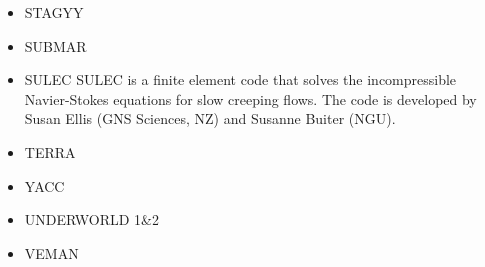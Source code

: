 \begin{itemize}
\item STAGYY
\cite{rota11}
\cite{yadl14}
\cite{crta14}


\item SUBMAR
\cite{masr06}
\cite{masp07}
\cite{roms10}


\item SULEC
SULEC is a finite element code that solves the incompressible Navier-Stokes equations 
for slow creeping flows. The code is developed by Susan Ellis 
(GNS Sciences, NZ) and Susanne Buiter (NGU). 

\cite{qube11}
\cite{ellw11}
\cite{buit12}
\cite{tebu12} 
\cite{crsg12}
\cite{grel12}
\cite{ghbu13}
\cite{ghbu14}
\cite{qubu14}
\cite{nabu15}
\cite{zwsn16}
\cite{tebu17}










\item TERRA
\cite{burb97}
\cite{burl98}
\cite{phbs09}
\cite{wodd09}
\cite{woda11}
\cite{dadb13}
\cite{vade16}



\item YACC
\cite{tosn15}
\cite{tomy16}

\item UNDERWORLD 1\&2
\cite{stfs06}
\cite{moql07} 
\cite{stfs07}
\cite{lemm08}
\cite{ozrl08}
\cite{casm10}
\cite{mamb10}
\cite{stsf10}
\cite{stfc10}
\cite{fasm10}
\cite{cafz11}
\cite{cafa12}
\cite{bemm13}
\cite{scmo13}
\cite{faca13}
\cite{famc14}
\cite{quxm15}
\cite{bemm15}
\cite{scsp15}
\cite{shmj15}
\cite{shmv16}
\cite{onlw16}
\cite{kicf16}
\cite{memm18}
\cite{samo19}
\cite{yamg19}

\item VEMAN
\cite{bepo10}


\end{itemize}
